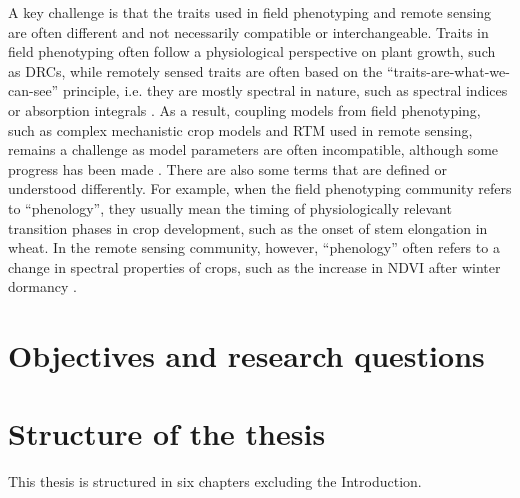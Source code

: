 A key challenge is that the traits used in field phenotyping and remote sensing are often different and not necessarily compatible or interchangeable. Traits in field phenotyping often follow a physiological perspective on plant growth, such as \gls{DRC}s, while remotely sensed traits are often based on the ``traits-are-what-we-can-see'' principle, i.e. they are mostly spectral in nature, such as spectral indices \cite{bannari_review_1995} or absorption integrals \citep[for example]{wocher_rtm-based_2020}. As a result, coupling models from field phenotyping, such as complex mechanistic crop models and \gls{RTM} used in remote sensing, remains a challenge as model parameters are often incompatible, although some progress has been made \citep[for example]{thorp_estimating_2012}. There are also some terms that are defined or understood differently. For example, when the field phenotyping community refers to ``phenology'', they usually mean the timing of physiologically relevant transition phases in crop development, such as the onset of stem elongation in wheat. In the remote sensing community, however, ``phenology'' often refers to a change in spectral properties of crops, such as the increase in \gls{NDVI} after winter dormancy \citep{de_beurs_land_2004}.



\section{Objectives and research questions}


\section{Structure of the thesis}

This thesis is structured in six chapters excluding the Introduction.
